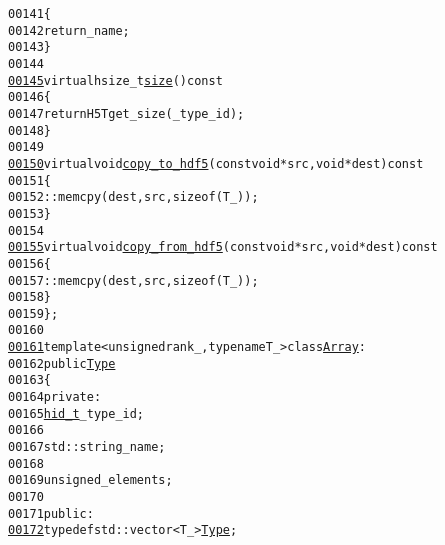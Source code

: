 \begin{footnotesize}
\begin{alltt}
00141 \textcolor{keyword}{                }\{
00142                     \textcolor{keywordflow}{return} \_name;
00143                 \}
00144 
\hypertarget{hdf5_8hh_source_l00145}{}\hyperlink{classeos_1_1hdf5_1_1Scalar_a88e62fcc7557957b737a45a9f6ac7952}{00145}                 \textcolor{keyword}{virtual} hsize\_t \hyperlink{classeos_1_1hdf5_1_1Scalar_a88e62fcc7557957b737a45a9f6ac7952}{size}()\textcolor{keyword}{ const}
00146 \textcolor{keyword}{                }\{
00147                     \textcolor{keywordflow}{return} H5Tget\_size(\_type\_id);
00148                 \}
00149 
\hypertarget{hdf5_8hh_source_l00150}{}\hyperlink{classeos_1_1hdf5_1_1Scalar_a4aeec2eb655199bd6ad02464eeb44648}{00150}                 \textcolor{keyword}{virtual} \textcolor{keywordtype}{void} \hyperlink{classeos_1_1hdf5_1_1Scalar_a4aeec2eb655199bd6ad02464eeb44648}{copy_to_hdf5}(\textcolor{keyword}{const} \textcolor{keywordtype}{void} * src, \textcolor{keywordtype}{void} * dest)\textcolor{keyword}{ const}
00151 \textcolor{keyword}{                }\{
00152                     ::memcpy(dest, src, \textcolor{keyword}{sizeof}(T\_));
00153                 \}
00154 
\hypertarget{hdf5_8hh_source_l00155}{}\hyperlink{classeos_1_1hdf5_1_1Scalar_a840b94c45ff51454eb2baae727165a71}{00155}                 \textcolor{keyword}{virtual} \textcolor{keywordtype}{void} \hyperlink{classeos_1_1hdf5_1_1Scalar_a840b94c45ff51454eb2baae727165a71}{copy_from_hdf5}(\textcolor{keyword}{const} \textcolor{keywordtype}{void} * src, \textcolor{keywordtype}{void} * dest)\textcolor{keyword}{ const}
00156 \textcolor{keyword}{                }\{
00157                     ::memcpy(dest, src, \textcolor{keyword}{sizeof}(T\_));
00158                 \}
00159         \};
00160 
\hypertarget{hdf5_8hh_source_l00161}{}\hyperlink{classeos_1_1hdf5_1_1Array}{00161}         \textcolor{keyword}{template} <\textcolor{keywordtype}{unsigned} rank\_, \textcolor{keyword}{typename} T\_> \textcolor{keyword}{class }\hyperlink{classeos_1_1hdf5_1_1Array}{Array} :
00162             \textcolor{keyword}{public} \hyperlink{classeos_1_1hdf5_1_1Array_a11f93349d9391d143099a25c59827610}{Type}
00163         \{
00164             \textcolor{keyword}{private}:
00165                 \hyperlink{namespaceeos_1_1hdf5_a5bd5e209f1bf36cdc5551465dacf2e74}{hid_t} \_type\_id;
00166 
00167                 std::string \_name;
00168 
00169                 \textcolor{keywordtype}{unsigned} \_elements;
00170 
00171             \textcolor{keyword}{public}:
\hypertarget{hdf5_8hh_source_l00172}{}\hyperlink{classeos_1_1hdf5_1_1Array_a11f93349d9391d143099a25c59827610}{00172}                 \textcolor{keyword}{typedef} std::vector<T\_> \hyperlink{classeos_1_1hdf5_1_1Array_a11f93349d9391d143099a25c59827610}{Type};

\end{alltt}
\end{footnotesize}
